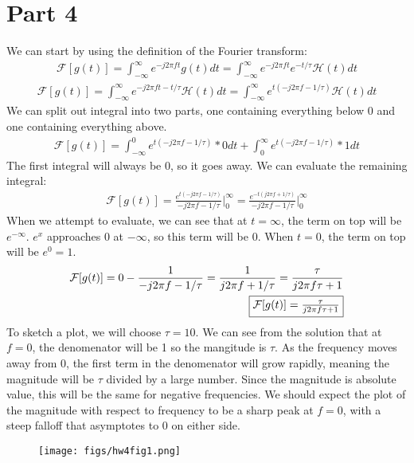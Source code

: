 \documentclass[12 pt]{article}
\begin{document}
\section*{Part 4}
We can start by using the definition of the Fourier transform:
\begin{align*}
    \mathcal{F}[g(t)]=\int_{-\infty}^{\infty}e^{-j2\pi ft}g(t)dt=\int_{-\infty}^{\infty}e^{-j2\pi ft}e^{-t/\tau}\mathcal{H}(t)dt
\end{align*}
\begin{align*}
    \mathcal{F}[g(t)]=\int_{-\infty}^{\infty}e^{-j2\pi ft-t/\tau}\mathcal{H}(t)dt=
    \int_{-\infty}^{\infty}e^{t(-j2\pi f-1/\tau)}\mathcal{H}(t)dt
\end{align*}
We can split out integral into two parts, one containing everything below 0 and one containing everything above.
\begin{align*}
    \mathcal{F}[g(t)]=\int_{-\infty}^{0}e^{t(-j2\pi f-1/\tau)}*0 dt + \int_{0}^{\infty}e^{t(-j2\pi f-1/\tau)}*1dt
\end{align*}
The first integral will always be 0, so it goes away. We can evaluate the remaining integral:
\begin{align*}
    \mathcal{F}[g(t)]=\frac{e^{t(-j2\pi f-1/\tau)}}{-j2\pi f-1/\tau}\Big|_0^{\infty}=\frac{e^{-t(j2\pi f+1/\tau)}}{-j2\pi f-1/\tau}\Big|_0^{\infty}
\end{align*}
When we attempt to evaluate, we can see that at $t=\infty$, the term on top will be $e^{-\infty}$. $e^x$ approaches 0 at
$-\infty$, so this term will be 0. When $t=0$, the term on top will be $e^0=1$.
\begin{align*}
    \mathcal{F}[g(t)]=0-\frac{1}{-j2\pi f-1/\tau}=\frac{1}{j2\pi f+1/\tau}=\frac{\tau}{j2\pi f\tau +1} \\
    \fbox{$\mathcal{F}[g(t)]=\frac{\tau}{j2\pi f\tau +1}$}
\end{align*}
To sketch a plot, we will choose $\tau=10$. We can see from the solution that at $f=0$, the denomenator will be 1 so the
mangitude is $\tau$. As the frequency moves away from 0, the first term in the denomenator will grow rapidly, meaning
the magnitude will be $\tau$ divided by a large number. Since the magnitude is absolute value, this will be the same for
negative frequencies. We should expect the plot of the magnitude with respect to frequency to be a sharp peak at $f=0$,
with a steep falloff that asymptotes to 0 on either side.
\begin{figure}[H]
    \centering
    \texttt{[image: figs/hw4fig1.png]}
\end{figure} \par
\end{document}
